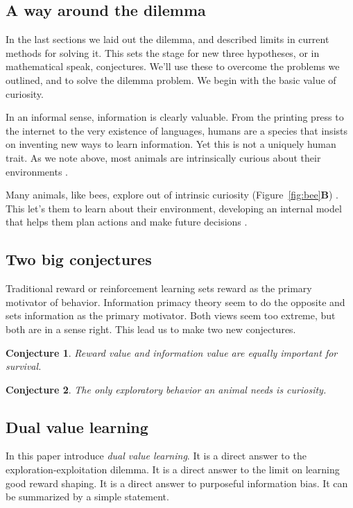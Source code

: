 \documentclass[9pt,lineno]{elife}
\newtheorem{conjecture}{Conjecture}
\begin{document}
\subsection*{A way around the dilemma}
\label{sec:dilemma}
In the last sections we laid out the dilemma, and described limits in current methods for solving it. This sets the stage for new three hypotheses, or in mathematical speak, conjectures. We'll use these to overcome the problems we outlined, and to solve the dilemma problem. We begin with the basic value of curiosity.

In an informal sense, information is clearly valuable.  From the printing press to the internet to the very existence of languages, humans are a species that insists on inventing new ways to learn information. Yet this is not a uniquely human trait. As we note above, most animals are intrinsically curious about their environments \citep{mehlhorn2015unpacking,hughes1997intrinsic, Gottlieb2018, kidd2015psychology}.

Many animals, like bees, explore out of intrinsic curiosity (Figure~\ref{fig:bee}\textbf{B}) \citep{mehlhorn2015unpacking}. This let's them to learn about their environment, developing an internal model that helps them plan actions and make future decisions \citep{Ahilan2019,Poucet1993}. 

\subsection*{Two big conjectures}
Traditional reward or reinforcement learning sets reward as the primary motivator of behavior. Information primacy theory seem to do the opposite and sets information as the primary motivator. Both views seem too extreme, but both are in a sense right. This lead us to make two new conjectures.

\begin{conjecture}
    \label{conj:1}
    Reward value and information value are equally important for survival.
\end{conjecture}

\begin{conjecture}
    \label{conj:2}
    The only exploratory behavior an animal needs is curiosity.
\end{conjecture}

\subsection*{Dual value learning}
In this paper introduce \textit{dual value learning}. It is a direct answer to the exploration-exploitation dilemma. It is a direct answer to the limit on learning good reward shaping. It is a direct answer to purposeful information bias. It can be summarized by a simple statement.
\end{document}
